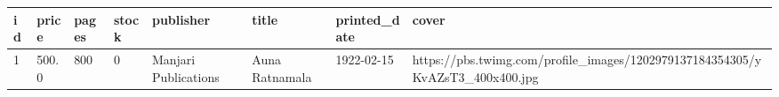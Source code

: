 \begin{longtable}[]{@{}llllllll@{}}
\toprule
id & price & pages & stock & publisher & title & printed\_date &
cover \\
\midrule
\endhead
1 & 500.0 & 800 & 0 & Manjari Publications & Auna Ratnamala & 1922-02-15
&
https://pbs.twimg.com/profile\_images/1202979137184354305/yKvAZsT3\_400x400.jpg \\
\bottomrule
\end{longtable}
